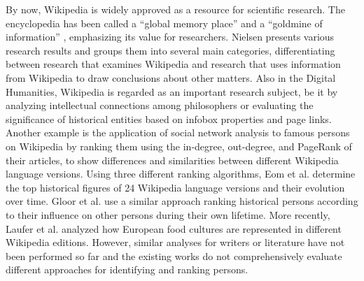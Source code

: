 \documentclass[a4paper,12pt]{scrartcl}
\begin{document}
By now, Wikipedia is widely approved as a resource for scientific
research.  The encyclopedia has been called a ``global memory place''
\cite{pentzold2009floatingGap} and a ``goldmine of information''
\cite{Medelyan2009Mining}, emphasizing its value for researchers.
Nielsen \cite{Nielsen2013WikipediaResearchReport} presents various
research results and groups them into several main categories,
differentiating between research that examines Wikipedia and research
that uses information from Wikipedia to draw conclusions about other
matters.
%
%
Also in the Digital Humanities, Wikipedia is regarded as an important
research subject, be it by analyzing intellectual connections among
philosophers \cite{athenikos2009philosophers} or evaluating the
significance of historical entities
\cite{takahashi2011historicalEntities} based on infobox properties
and page links.
%
Another example is the application of social network analysis to
famous persons on Wikipedia 
%
\cite{Aragon2012biographical} by ranking them using the in-degree,
out-degree, and PageRank of their articles, to show differences and
similarities between different Wikipedia language versions. 
Using three different ranking algorithms, Eom et al.
\cite{eom2015interactions} determine the top historical 
figures of 24 Wikipedia language versions and their evolution over time.
%
Gloor et al. \cite{gloor2015cultural} use a similar approach ranking
historical persons according to their influence on other persons 
during their own lifetime.
%
More recently, Laufer et al. \cite{laufer2015mining} analyzed how
European food cultures are represented in different Wikipedia
editions.
%
%
However, similar analyses for writers or literature have not been
performed so far and the existing works do not comprehensively
evaluate different approaches for identifying and ranking persons.
\end{document}

